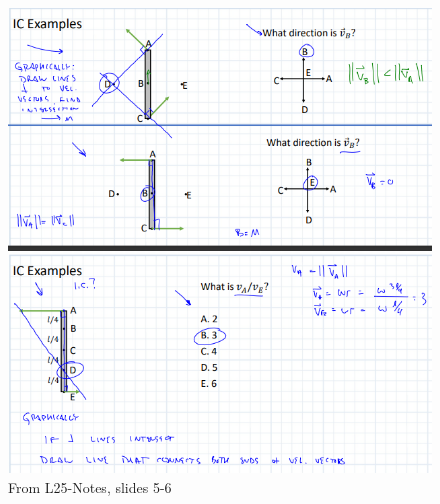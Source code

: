 
\begin{figure}[h!]
    \centering \includegraphics{RigidBodyKineticsFigs/ICexamples1.png}
    \caption{From L25-Notes, slides 5-6}
    \label{fig:ICexamples1}
\end{figure}

